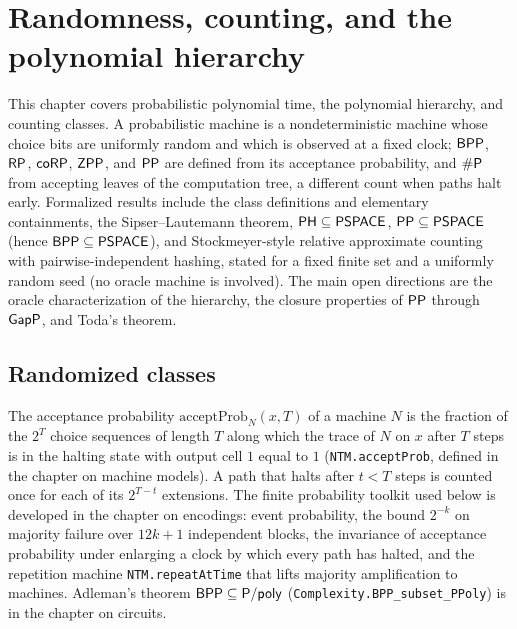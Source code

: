 \chapter{Randomness, counting, and the polynomial hierarchy}
\label{chap:randomness}

This chapter covers probabilistic polynomial time, the polynomial hierarchy,
and counting classes. A probabilistic machine is a nondeterministic machine
whose choice bits are uniformly random and which is observed at a fixed clock;
$\mathsf{BPP}$, $\mathsf{RP}$, $\mathsf{coRP}$, $\mathsf{ZPP}$, and $\mathsf{PP}$ are defined from
its acceptance probability, and $\#\mathsf{P}$ from accepting leaves of the
computation tree, a different count when paths halt early. Formalized results
include the class definitions and elementary containments, the
Sipser--Lautemann theorem, $\mathsf{PH} \subseteq \mathsf{PSPACE}$,
$\mathsf{PP} \subseteq \mathsf{PSPACE}$ (hence $\mathsf{BPP} \subseteq \mathsf{PSPACE}$), and
Stockmeyer-style relative approximate
counting with pairwise-independent hashing, stated for a fixed finite set and a
uniformly random seed (no oracle machine is involved). The main open directions
are the oracle characterization of the hierarchy, the closure properties of
$\mathsf{PP}$ through $\mathsf{GapP}$, and Toda's theorem.

\section{Randomized classes}

The acceptance probability $\mathrm{acceptProb}_N(x, T)$ of a machine $N$ is
the fraction of the $2^T$ choice sequences of length $T$ along which the trace
of $N$ on $x$ after $T$ steps is in the halting state with output cell $1$
equal to $1$ (\texttt{NTM.acceptProb}, defined in the chapter on machine
models). A path that halts after $t < T$ steps is counted once for each of its
$2^{T - t}$ extensions. The finite probability toolkit used below is developed
in the chapter on encodings: event probability, the bound $2^{-k}$ on majority
failure over $12k + 1$ independent blocks, the invariance of acceptance
probability under enlarging a clock by which every path has halted, and the
repetition machine \texttt{NTM.repeatAtTime} that lifts majority amplification
to machines. Adleman's theorem $\mathsf{BPP} \subseteq \mathsf{P/poly}$
(\texttt{Complexity.BPP\_subset\_PPoly}) is in the chapter on circuits.

